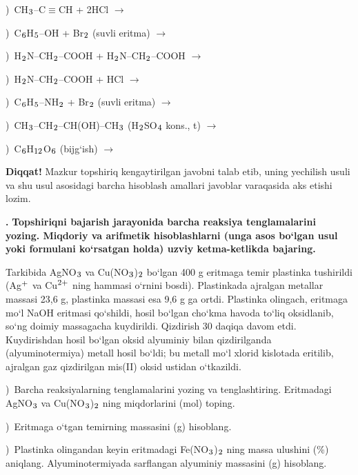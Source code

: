\documentclass[11pt,a4paper]{article}
\renewcommand{\textsubscript}[1]{\ensuremath{_{\text{\fontsize{8}{8}\selectfont #1}}}}
\renewcommand{\textsuperscript}[1]{\ensuremath{^{\text{\fontsize{8}{8}\selectfont #1}}}}
\newcommand{\qn}[1]{\textbf{\fontsize{11.5}{13}\selectfont #1}}
\newcommand{\qsep}{\par\vspace{13pt}}
\newcommand{\diqqat}[1]{\par\smallskip\noindent\textbf{Diqqat!} #1\par\medskip}
\begin{document}
)\ CH\textsubscript{3}--C$\equiv$CH + 2HCl $\to$\par
{})\ C\textsubscript{6}H\textsubscript{5}--OH + Br\textsubscript{2} (suvli eritma) $\to$\par
{})\ H\textsubscript{2}N--CH\textsubscript{2}--COOH + H\textsubscript{2}N--CH\textsubscript{2}--COOH $\to$\par
{})\ H\textsubscript{2}N--CH\textsubscript{2}--COOH + HCl $\to$\par
{})\ C\textsubscript{6}H\textsubscript{5}--NH\textsubscript{2} + Br\textsubscript{2} (suvli eritma) $\to$\par
{})\ CH\textsubscript{3}--CH\textsubscript{2}--CH(OH)--CH\textsubscript{3} (H\textsubscript{2}SO\textsubscript{4} kons., t) $\to$\par
{})\ C\textsubscript{6}H\textsubscript{12}O\textsubscript{6} (bijg`ish) $\to$\par
\diqqat{Mazkur topshiriq kengaytirilgan javobni talab etib, uning yechilish usuli va shu usul asosidagi barcha hisoblash amallari javoblar varaqasida aks etishi lozim.}\qsep
\noindent\qn{43.} \textbf{Topshiriqni bajarish jarayonida barcha reaksiya tenglamalarini yozing. Miqdoriy va arifmetik hisoblashlarni (unga asos bo`lgan usul yoki formulani ko`rsatgan holda) uzviy ketma-ketlikda bajaring.}\par\smallskip
Tarkibida AgNO\textsubscript{3} va Cu(NO\textsubscript{3})\textsubscript{2} bo`lgan 400 g eritmaga temir plastinka tushirildi (Ag\textsuperscript{+} va Cu\textsuperscript{2+} ning hammasi o`rnini bosdi). Plastinkada ajralgan metallar massasi 23,6 g, plastinka massasi esa 9,6 g ga ortdi. Plastinka olingach, eritmaga mo`l NaOH eritmasi qo`shildi, hosil bo`lgan cho`kma havoda to`liq oksidlanib, so`ng doimiy massagacha kuydirildi. Qizdirish 30 daqiqa davom etdi. Kuydirishdan hosil bo`lgan oksid alyuminiy bilan qizdirilganda (alyuminotermiya) metall hosil bo`ldi; bu metall mo`l xlorid kislotada eritilib, ajralgan gaz qizdirilgan mis(II) oksid ustidan o`tkazildi.\par
{})\ Barcha reaksiyalarning tenglamalarini yozing va tenglashtiring. Eritmadagi AgNO\textsubscript{3} va Cu(NO\textsubscript{3})\textsubscript{2} ning miqdorlarini (mol) toping.\par
{})\ Eritmaga o`tgan temirning massasini (g) hisoblang.\par
{})\ Plastinka olingandan keyin eritmadagi Fe(NO\textsubscript{3})\textsubscript{2} ning massa ulushini (\%) aniqlang. Alyuminotermiyada sarflangan alyuminiy massasini (g) hisoblang.\par
\end{document}
